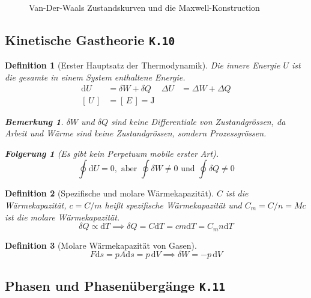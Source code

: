 \documentclass[a4paper, twocolumn]{article}
\numberwithin{equation}{section}
\theoremstyle{hsr-def}
\newtheorem{definition}{Definition}[section]
\theoremstyle{hsr-sub}
\newtheorem{result}{Folgerung}[definition]
\newtheorem{remark}{Bemerkung}[definition]
\newcommand{\dd}[1]{\ensuremath{\mathrm{d}#1}}
\newcommand{\di}[1]{\,\dd{#1}}
\newcommand{\unitof}[1]{\ensuremath{\left[\,#1\,\right]}}
\newcommand{\fromlecture}[1]{\textcolor{red!70!black}{\small\texttt{K.#1}}}
\begin{document}
\begin{figure}[h] \centering
    
    \caption{Van-Der-Waals Zustandskurven und die Maxwell-Konstruction}
    \label{fig:maxwell-isotherm}
\end{figure}

\subsection{Kinetische Gastheorie \fromlecture{10}}
\begin{definition}[Erster Hauptsatz der Thermodynamik]
Die innere Energie \(U\) ist die gesamte in einem System enthaltene Energie.
\begin{align*}
    \dd{U} &= \delta W + \delta Q &
    \Delta U &= \Delta W + \Delta Q \\
    \unitof{U} &= \unitof{E} = \si{\joule}
\end{align*}
\begin{remark}
\(\delta W\) und \(\delta Q\) sind keine Differentiale von Zustandgr\"ossen, da Arbeit und W\"arme sind keine Zustandgr\"ossen, sondern Prozessgr\"ossen.
\end{remark}
\begin{result}[Es gibt kein Perpetuum mobile erster Art]
\[
    \oint \dd{U} = 0, \text{ aber } \oint \delta W \neq 0 \text{ und } \oint \delta Q \neq 0
\]
\end{result}
\end{definition}

\begin{definition}[Spezifische und molare W\"armekapazit\"at]
\(C\) ist die W\"armekapazit\"at, \(c = C/m\) hei{\ss}t \emph{spezifische} W\"armekapazit\"at und \(C_m = C/n = Mc\) ist die \emph{molare} W\"armekapazit\"at.
\[
    \delta Q \propto \dd{T} \implies \delta Q = C\dd{T} = cm\dd{T} = C_m n\dd{T}
\]
\end{definition}

\begin{definition}[Molare W\"armekapazit\"at von Gasen]
\[
    F\dd{s} = pA\dd{s} = p\di{V} \implies \delta W = -p\di{V}
\]
\end{definition}

\subsection{Phasen und Phasen\"uberg\"ange \fromlecture{11}}
\end{document}
